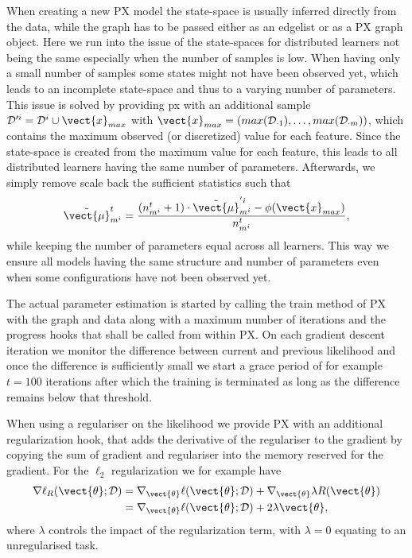 When creating a new PX model the state-space is usually inferred directly from the data, while the graph has to be passed either as an edgelist or as a PX graph object. 
Here we run into the issue of the state-spaces for distributed learners not being the same especially when the number of samples is low. 
When having only a small number of samples some states might not have been observed yet, which leads to an incomplete state-space and thus to a varying number of parameters. 
This issue is solved by providing px with an additional sample $\mathcal{D}'^i = \mathcal{D}^i \cup \vect{x}_{max}$ with $\vect{x}_{max} = (max(\mathcal{D}_{\cdot 1}), \ldots, max(\mathcal{D}_{\cdot m}))$, which contains the maximum observed (or discretized) value for each feature.
Since the state-space is created from the maximum value for each feature, this leads to all distributed learners having the same number of parameters.
Afterwards, we simply remove scale back the sufficient statistics such that
\begin{equation}
    \tilde{\vect{\mu}}^t_{m^i} = \frac{(n^t_{m^i} + 1) \cdot \tilde{\vect{\mu}}^{'i}_{m^i} - \phi(\vect{x}_{max})}{n^t_{m^{i}}},
\end{equation}
while keeping the number of parameters equal across all learners.
This way we ensure all models having the same structure and number of parameters even when some configurations have not been observed yet.

The actual parameter estimation is started by calling the train method of PX with the graph and data along with a maximum number of iterations and the progress hooks that shall be called from within PX.
On each gradient descent iteration we monitor the difference between current and previous likelihood and once the difference is sufficiently small we start a grace period of for example $t=100$ iterations after which the training is terminated as long as the difference remains below that threshold.

When using a regulariser on the likelihood we provide PX with an additional regularization hook, that  adds the derivative of the regulariser to the gradient by copying the sum of gradient and regulariser into the memory reserved for the gradient. 
For the $\ell_2$ regularization we for example have 
\begin{equation}
    \begin{split}
    \nabla \ell_R( \vect{\theta}; \mathcal{D}) &= \nabla_{\vect{\theta}} \ell( \vect{\theta}; \mathcal{D}) +  \nabla_{\vect{\theta}}\lambda R(\vect{\theta}) \\
    &=\nabla_{\vect{\theta}} \ell( \vect{\theta}; \mathcal{D}) +  2\lambda \vect{\theta},
    \end{split}
\end{equation} 
where $\lambda$ controls the impact of the regularization term, with $\lambda=0$ equating to an unregularised task.

